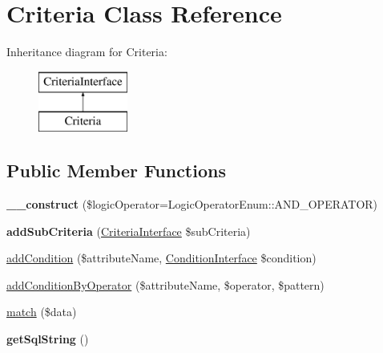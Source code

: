 \hypertarget{class_pes_1_1_query_1_1_criteria}{}\section{Criteria Class Reference}
\label{class_pes_1_1_query_1_1_criteria}
Inheritance diagram for Criteria\+:\begin{figure}[H]
\begin{center}
\leavevmode
\includegraphics[height=2.000000cm]{class_pes_1_1_query_1_1_criteria}
\end{center}
\end{figure}
\subsection*{Public Member Functions}
\begin{DoxyCompactItemize}
\item 
\mbox{\label{class_pes_1_1_query_1_1_criteria_a7c32f131904c5ebcfc973c2bc3e1b2db}} 
{\bfseries \+\_\+\+\_\+construct} (\$logic\+Operator=Logic\+Operator\+Enum\+::\+A\+N\+D\+\_\+\+O\+P\+E\+R\+A\+T\+OR)
\item 
\mbox{\label{class_pes_1_1_query_1_1_criteria_a0284a6c5687b359c543d66e29d55e83d}} 
{\bfseries add\+Sub\+Criteria} (\mbox{\hyperlink{interface_pes_1_1_query_1_1_criteria_interface}{Criteria\+Interface}} \$sub\+Criteria)
\item 
\mbox{\hyperlink{class_pes_1_1_query_1_1_criteria_a7d83ab6f13d502a4fafc804c9de53b4c}{add\+Condition}} (\$attribute\+Name, \mbox{\hyperlink{interface_pes_1_1_query_1_1_condition_interface}{Condition\+Interface}} \$condition)
\item 
\mbox{\hyperlink{class_pes_1_1_query_1_1_criteria_a8e034cc6deb93e7290faa3afd9c6fe7e}{add\+Condition\+By\+Operator}} (\$attribute\+Name, \$operator, \$pattern)
\item 
\mbox{\hyperlink{class_pes_1_1_query_1_1_criteria_a48b6d7b7067e359810e5cc46d458ad43}{match}} (\$data)
\item 
\mbox{\label{class_pes_1_1_query_1_1_criteria_a60f88a13135803a03975ff6555ece43f}} 
{\bfseries get\+Sql\+String} ()
\end{DoxyCompactItemize}


